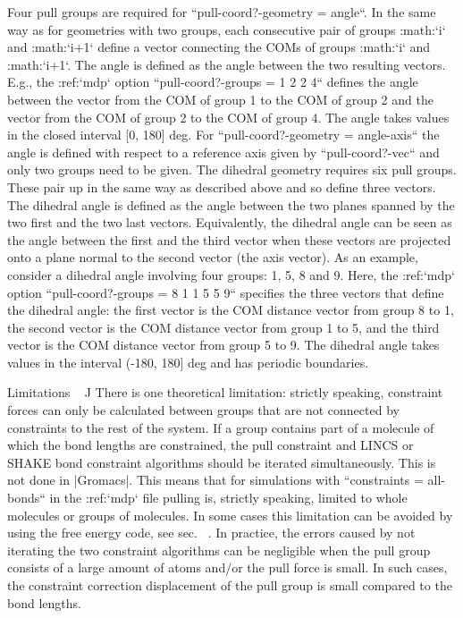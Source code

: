 Four pull groups are required for ``pull-coord?-geometry =
angle``. In the same way as for geometries with two groups, each
consecutive pair of groups :math:`i` and :math:`i+1` define a vector
connecting the COMs of groups :math:`i` and :math:`i+1`. The angle is
defined as the angle between the two resulting vectors. E.g., the
:ref:`mdp` option ``pull-coord?-groups = 1 2 2 4``
defines the angle between the vector from the COM of group 1 to the COM
of group 2 and the vector from the COM of group 2 to the COM of group 4.
The angle takes values in the closed interval [0, 180] deg. For
``pull-coord?-geometry = angle-axis`` the angle is defined
with respect to a reference axis given by
``pull-coord?-vec`` and only two groups need to be given.
The dihedral geometry requires six pull groups. These pair up in the
same way as described above and so define three vectors. The dihedral
angle is defined as the angle between the two planes spanned by the two
first and the two last vectors. Equivalently, the dihedral angle can be
seen as the angle between the first and the third vector when these
vectors are projected onto a plane normal to the second vector (the axis
vector). As an example, consider a dihedral angle involving four groups:
1, 5, 8 and 9. Here, the :ref:`mdp` option
``pull-coord?-groups = 8 1 1 5 5 9`` specifies the three
vectors that define the dihedral angle: the first vector is the COM
distance vector from group 8 to 1, the second vector is the COM distance
vector from group 1 to 5, and the third vector is the COM distance
vector from group 5 to 9. The dihedral angle takes values in the
interval (-180, 180] deg and has periodic boundaries.

Limitations
^^^^^^^^^^^

There is one theoretical limitation: strictly speaking, constraint
forces can only be calculated between groups that are not connected by
constraints to the rest of the system. If a group contains part of a
molecule of which the bond lengths are constrained, the pull constraint
and LINCS or SHAKE bond constraint algorithms should be iterated
simultaneously. This is not done in |Gromacs|. This means that for
simulations with ``constraints = all-bonds`` in the
:ref:`mdp` file pulling is, strictly speaking, limited to
whole molecules or groups of molecules. In some cases this limitation
can be avoided by using the free energy code, see
sec. 
. In practice, the errors caused by not
iterating the two constraint algorithms can be negligible when the pull
group consists of a large amount of atoms and/or the pull force is
small. In such cases, the constraint correction displacement of the pull
group is small compared to the bond lengths.


